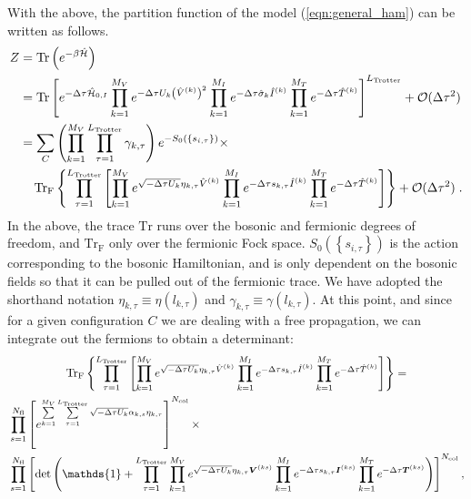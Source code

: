 With the above, the partition function of the model (\ref{eqn:general_ham}) can be written as follows.
\begin{align}\label{eqn:partition_1}
Z &= \mathop{\mathrm{Tr}}{\left(e^{-\beta \hat{\mathcal{H}} }\right)}\nonumber\\
  &=   \mathop{\mathrm{Tr}}{  \left[ e^{-\Delta \tau \hat{\mathcal{H}}_{0,I}}  
    \prod_{k=1}^{M_V}   e^{ - \Delta \tau  U_k \left(  \hat{V}^{(k)} \right)^2}   \prod_{k=1}^{M_I}   e^{  -\Delta \tau  \hat{\sigma}_{k}  \hat{I}^{(k)}} 
     \prod_{k=1}^{M_T}   e^{-\Delta \tau \hat{T}^{(k)}}  
   \right]^{L_{\text{Trotter}}}}  + \mathcal{O}(\Delta\tau^{2})\nonumber \\
   &=
   \sum_{C} \left( \prod_{k=1}^{M_V} \prod_{\tau=1}^{L_{\mathrm{Trotter}}} \gamma_{k,\tau} \right) e^{-S_0 \left( \left\{ s_{i,\tau} \right\}  \right) }\times \nonumber\\
   &\quad
    \mathop{\mathrm{Tr}_{\mathrm{F}}}{ \left\{  \prod_{\tau=1}^{L_{\mathrm{Trotter}}} \left[  
    \prod_{k=1}^{M_V}   e^{  \sqrt{ -\Delta \tau  U_k} \eta_{k,\tau} \hat{V}^{(k)} }   \prod_{k=1}^{M_I}   e^{  -\Delta \tau s_{k,\tau}  \hat{I}^{(k)}}  
      \prod_{k=1}^{M_T}   e^{-\Delta \tau \hat{T}^{(k)}}    \right]\right\} }+ \mathcal{O}(\Delta\tau^{2})\;.
\end{align}
In the above,  the trace $\mathrm{Tr} $  runs over the bosonic   and  fermionic degrees of freedom, and $ \mathrm{Tr}_{\mathrm{F}}  $ only over the  fermionic Fock space. 
$S_0 \left( \left\{ s_{i,\tau} \right\}  \right)  $ is the action  corresponding to the bosonic Hamiltonian, and is only dependent on the bosonic fields so that  it can be pulled out of the fermionic trace.  We have adopted the shorthand notation $\eta_{k,\tau} \equiv \eta(l_{k,\tau})$   and $\gamma_{k,\tau} \equiv \gamma(l_{k,\tau})$.
At this point,  and  since for a given configuration $C$  we are dealing with a free propagation, we can integrate out the fermions to obtain a determinant: 
\begin{multline}
\Trf{ \left\{  \prod_{\tau=1}^{L_{\mathrm{Trotter}}} \left[    
    \prod_{k=1}^{M_V}   e^{  \sqrt{ - \Delta \tau  U_k} \eta_{k,\tau} \hat{V}^{(k)} }   \prod_{k=1}^{M_I}   e^{  -\Delta \tau s_{k,\tau}  \hat{I}^{(k)}} 
    \prod_{k=1}^{M_T}   e^{-\Delta \tau \hat{T}^{(k)}}   \right]   \right\}} = \\
\begin{aligned}
&\prod\limits_{s=1}^{N_{\mathrm{fl}}} \left[  e^{\sum\limits_{k=1}^{M_V} \sum\limits_{\tau = 1}^{L_{\mathrm{Trotter}}}\sqrt{-\Delta \tau U_k}  \alpha_{k,s} \eta_{k,\tau} } \right]^{N_{\mathrm{col}}} \times \\
&\prod\limits_{s=1}^{N_{\mathrm{fl}}} 
   \left[
    \det\left(  \mathds{1} + 
     \prod_{\tau=1}^{L_{\mathrm{Trotter}}}   
    \prod_{k=1}^{M_V}   e^{  \sqrt{ -\Delta \tau  U_k} \eta_{k,\tau} {\bm V}^{(ks)} }   \prod_{k=1}^{M_I}   e^{  -\Delta \tau s_{k,\tau}  {\bm I}^{(ks)}}  
      \prod_{k=1}^{M_T}   e^{-\Delta \tau \bm{T}^{(ks)}}   \right) \right]^{N_{\mathrm{col}}},
\end{aligned}
\end{multline}

